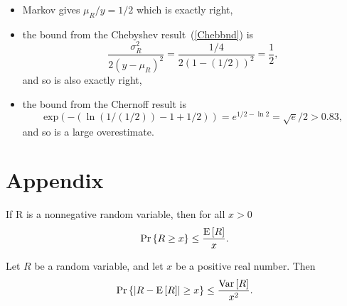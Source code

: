 \documentclass[11pt]{article}
\begin{document}
\begin{problem}
\begin{problemparts}
{\begin{itemize}
\item Markov gives $\mu_R/y = 1/2$ which is exactly right,

\item the bound from the Chebyshev result~(\ref{Chebbnd}) is
\[
\frac{\sigma_R^2}{2(y - \mu_R)^2} = \frac{1/4}{2(1-(1/2))^2} = \frac{1}{2},
\]
and so is also exactly right,

\item the bound from the Chernoff result is
\[
\text{exp}(- (\ln (1/(1/2)) - 1 + 1/2)) = e^{1/2 - \ln 2} = \sqrt{e}/2 > 0.83,
\]
and so is a large overestimate.

\end{itemize}
}

\iffalse
\problempart Discuss when the Chebyshev bound on $\pr{R > c\expect{R}}$ is
tighter than the Chernoff bound, where R is positive and $c>1$. (Providing
an example is sufficient.)

\solution{Consider the case where $c$ is small, that is, $c=1+\epsilon$
and $\epsilon < 1$.  Assume that $\variance{R}=\expect{R}=1$.  The
Chernoff bound is $e^{-(c\ln{c}-c+1)}$.  Numerical experiments show that
\[
\frac{1}{1+\epsilon^2} < e^{-(c\ln{c}-c+1)}.
\]
Therefore, the Chebyshev one-sided bound on $\pr{R>c\expect{R}}$ is
tighter than the Chernoff bound.}
\fi

\end{problemparts}
\end{problem}


%


\appendix
\section{Appendix}
\setcounter{secnumdepth}{0}


\begin{theorem*}
 If R is a nonnegative random variable, then for all $x > 0$
\begin{equation}\label{M}
\mathop{\textup{Pr}}\nolimits\left\{R \geq x\right\} \leq \frac{\mathop{\textup{E}}\nolimits\left[R\right]}{x}.
\end{equation}
\end{theorem*}

\begin{theorem*}[Chebyshev]
Let $R$ be a random variable, and let $x$ be a positive real number.
Then
\begin{equation}\label{Cheb}
\mathop{\textup{Pr}}\nolimits\left\{\left|R - \mathop{\textup{E}}\nolimits\left[R\right]\right| \geq x\right\} \leq \frac{\mathop{\textup{Var}}\nolimits\left[R\right]}{x^2}.
\end{equation}
\end{theorem*}
\end{document}
